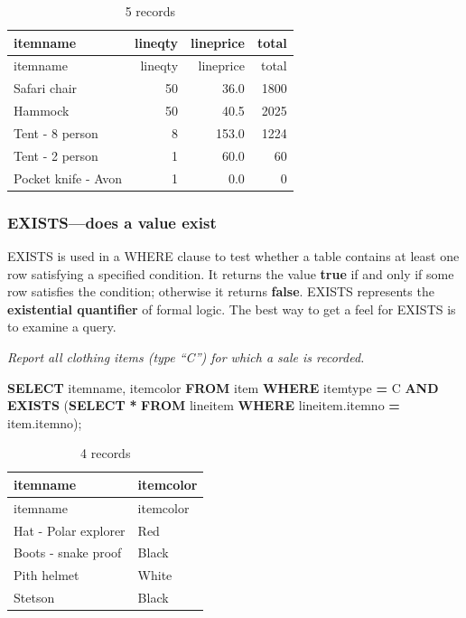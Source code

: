 \documentclass[
]{article}
\newenvironment{Shaded}{\begin{snugshade}}{\end{snugshade}}
\newcommand{\KeywordTok}[1]{\textcolor[rgb]{0.13,0.29,0.53}{\textbf{#1}}}
\newcommand{\NormalTok}[1]{#1}
\newcommand{\OperatorTok}[1]{\textcolor[rgb]{0.81,0.36,0.00}{\textbf{#1}}}
\newcommand{\StringTok}[1]{\textcolor[rgb]{0.31,0.60,0.02}{#1}}
\begin{document}
\begin{longtable}[]{@{}lrrr@{}}
\caption{5 records}\tabularnewline
\toprule()
itemname & lineqty & lineprice & total \\
\midrule()
\endfirsthead
\toprule()
itemname & lineqty & lineprice & total \\
\midrule()
\endhead
Safari chair & 50 & 36.0 & 1800 \\
Hammock & 50 & 40.5 & 2025 \\
Tent - 8 person & 8 & 153.0 & 1224 \\
Tent - 2 person & 1 & 60.0 & 60 \\
Pocket knife - Avon & 1 & 0.0 & 0 \\
\bottomrule()
\end{longtable}

\hypertarget{existsdoes-a-value-exist}{%
\subsubsection{EXISTS---does a value
exist}\label{existsdoes-a-value-exist}}

EXISTS is used in a WHERE clause to test whether a table contains at
least one row satisfying a specified condition. It returns the value
\textbf{true} if and only if some row satisfies the condition; otherwise
it returns \textbf{false}. EXISTS represents the \textbf{existential
quantifier} of formal logic. The best way to get a feel for EXISTS is to
examine a query.

\emph{Report all clothing items (type ``C'') for which a sale is
recorded.}

\begin{Shaded}
\begin{Highlighting}[]
\KeywordTok{SELECT}\NormalTok{ itemname, itemcolor }\KeywordTok{FROM}\NormalTok{ item}
    \KeywordTok{WHERE}\NormalTok{ itemtype }\OperatorTok{=} \StringTok{\textquotesingle{}C\textquotesingle{}}
    \KeywordTok{AND} \KeywordTok{EXISTS}\NormalTok{ (}\KeywordTok{SELECT} \OperatorTok{*} \KeywordTok{FROM}\NormalTok{ lineitem}
        \KeywordTok{WHERE}\NormalTok{ lineitem.itemno }\OperatorTok{=}\NormalTok{ item.itemno);}
\end{Highlighting}
\end{Shaded}

\begin{longtable}[]{@{}ll@{}}
\caption{4 records}\tabularnewline
\toprule()
itemname & itemcolor \\
\midrule()
\endfirsthead
\toprule()
itemname & itemcolor \\
\midrule()
\endhead
Hat - Polar explorer & Red \\
Boots - snake proof & Black \\
Pith helmet & White \\
Stetson & Black \\
\bottomrule()
\end{longtable}
\end{document}
